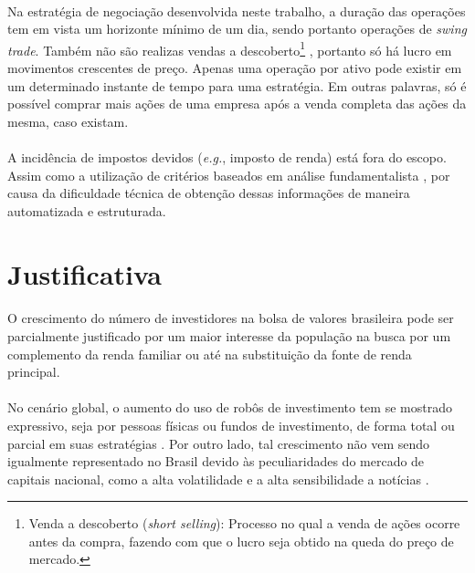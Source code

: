 \paragraph{} Na estratégia de negociação desenvolvida neste trabalho, a duração das operações tem em vista um horizonte mínimo de um dia, sendo portanto operações de \textit{swing trade}. Também não são realizas vendas a descoberto\footnote{Venda a descoberto (\textit{short selling}): Processo no qual a venda de ações ocorre antes da compra, fazendo com que o lucro seja obtido na queda do preço de mercado.} \cite{short_selling}, portanto só há lucro em movimentos crescentes de preço. Apenas uma operação por ativo pode existir em um determinado instante de tempo para uma estratégia. Em outras palavras, só é possível comprar mais ações de uma empresa após a venda completa das ações da mesma, caso existam.

\paragraph{} A incidência de impostos devidos (\textit{e.g.}, imposto de renda) está fora do escopo. Assim como a utilização de critérios baseados em análise fundamentalista \cite{bulkowski2012fundamental}, por causa da dificuldade técnica de obtenção dessas informações de maneira automatizada e estruturada.



\FloatBarrier
\section{Justificativa}

\paragraph{} O crescimento do número de investidores na bolsa de valores brasileira \cite{aumento_investidores} pode ser parcialmente justificado por um maior interesse da população na busca por um complemento da renda familiar ou até na substituição da fonte de renda principal.

\paragraph{} No cenário global, o aumento do uso de robôs de investimento tem se mostrado expressivo, seja por pessoas físicas ou fundos de investimento, de forma total ou parcial em suas estratégias \cite{robos_investidores, investing_robot}. Por outro lado, tal crescimento não vem sendo igualmente representado no Brasil devido às peculiaridades do mercado de capitais nacional, como a alta volatilidade e a alta sensibilidade a notícias \cite{robos_e_fundos}.

